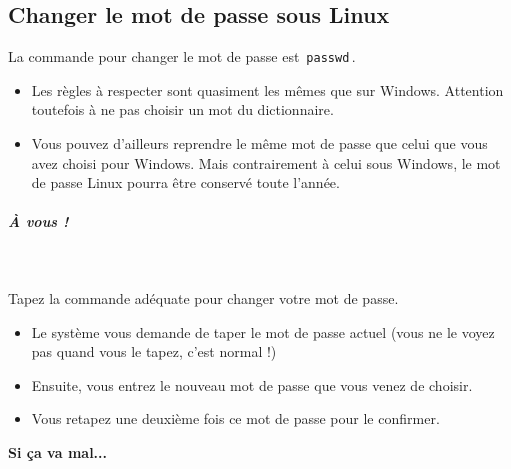 \documentclass[a4paper,11pt]{article}
\begin{document}
\subsection{Changer le mot de passe sous Linux}
La commande pour changer le mot de passe est \,\verb|passwd|\,.
				
 \par
        
\begin{itemize}
				
\item Les r\`egles \`a respecter sont quasiment les m\^emes que sur Windows. Attention toutefois \`a ne pas choisir un mot du dictionnaire.
\item Vous pouvez d'ailleurs reprendre le m\^eme mot de passe que celui que vous avez choisi pour Windows. Mais contrairement \`a celui sous Windows, le mot de passe Linux pourra \^etre conserv\'e toute l'ann\'ee.
					
\end{itemize}
				
			
\subparagraph{\`A vous !} 
		
\textcolor{white}{.} \par
				
 \par
        
Tapez la commande ad\'equate pour changer votre mot de passe.
				
\par
        
\begin{itemize}
				
\item Le syst\`eme vous demande de taper le mot de passe actuel (vous ne le voyez pas quand vous le tapez, c'est normal !)
\item Ensuite, vous entrez le nouveau mot de passe que vous venez de choisir.
\item Vous retapez une deuxi\`eme fois ce mot de passe pour le confirmer.

\end{itemize}
\textbf{Si \c ca va mal...}
\par
        
\end{document}
